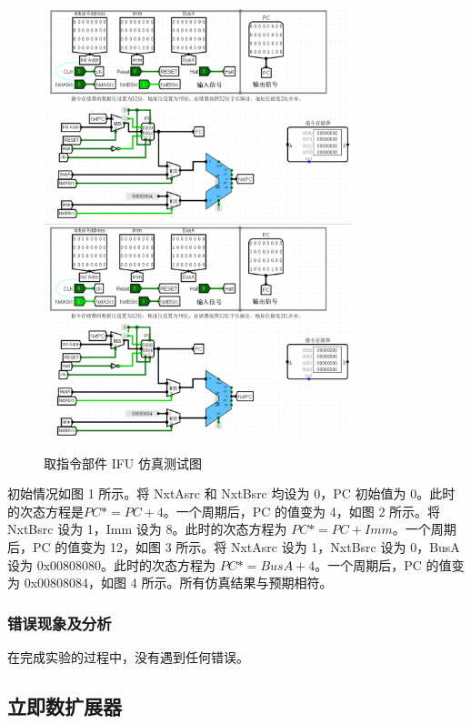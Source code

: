 \documentclass{article}
\begin{document}
    \begin{figure}[H]
        \centering
        \includegraphics[width=0.8\textwidth]{3.5.3.png}
        \includegraphics[width=0.8\textwidth]{3.5.4.png}
        \caption{取指令部件 IFU 仿真测试图}
    \end{figure}
    初始情况如图 1 所示。将 NxtAsrc 和 NxtBsrc 均设为 0，PC 初始值为 0。此时的次态方程是$PC* = PC + 4$。一个周期后，PC 的值变为 4，如图 2 所示。将 NxtBsrc 设为 1，Imm 设为 8。此时的次态方程为 $PC* = PC + Imm$。一个周期后，PC 的值变为 12，如图 3 所示。将 NxtAsrc 设为 1，NxtBsrc 设为 0，BusA 设为 0x00808080。此时的次态方程为 $PC* = BusA + 4$。一个周期后，PC 的值变为 0x00808084，如图 4 所示。所有仿真结果与预期相符。
    
    \subsubsection{错误现象及分析}
    在完成实验的过程中，没有遇到任何错误。

    \subsection{立即数扩展器}
\end{document}
